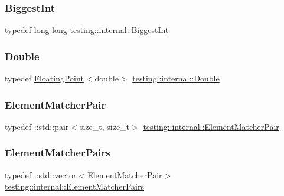\subsubsection{\texorpdfstring{Biggest\+Int}{BiggestInt}}
{\footnotesize\ttfamily typedef long long \hyperlink{namespacetesting_1_1internal_a05c6bd9ede5ccdf25191a590d610dcc6}{testing\+::internal\+::\+Biggest\+Int}}

\mbox{\label{namespacetesting_1_1internal_a66a7579b1893b260c31dad577f7a5c48}} 
\subsubsection{\texorpdfstring{Double}{Double}}
{\footnotesize\ttfamily typedef \hyperlink{classtesting_1_1internal_1_1_floating_point}{Floating\+Point}$<$double$>$ \hyperlink{namespacetesting_1_1internal_a66a7579b1893b260c31dad577f7a5c48}{testing\+::internal\+::\+Double}}

\mbox{\label{namespacetesting_1_1internal_a109863545f08651178bf0f520aebd33b}} 
\subsubsection{\texorpdfstring{Element\+Matcher\+Pair}{ElementMatcherPair}}
{\footnotesize\ttfamily typedef \+::std\+::pair$<$size\+\_\+t, size\+\_\+t$>$ \hyperlink{namespacetesting_1_1internal_a109863545f08651178bf0f520aebd33b}{testing\+::internal\+::\+Element\+Matcher\+Pair}}

\mbox{\label{namespacetesting_1_1internal_a0038618710c01a71150887dc7cfb0a29}} 
\subsubsection{\texorpdfstring{Element\+Matcher\+Pairs}{ElementMatcherPairs}}
{\footnotesize\ttfamily typedef \+::std\+::vector$<$\hyperlink{namespacetesting_1_1internal_a109863545f08651178bf0f520aebd33b}{Element\+Matcher\+Pair}$>$ \hyperlink{namespacetesting_1_1internal_a0038618710c01a71150887dc7cfb0a29}{testing\+::internal\+::\+Element\+Matcher\+Pairs}}


